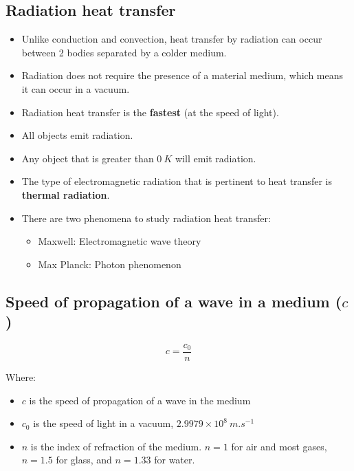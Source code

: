 \documentclass[11pt]{article}
\begin{document}
\subsection{Radiation heat transfer}
\label{sec:org29b78fd}
\begin{itemize}
\item Unlike conduction and convection, heat transfer by radiation can occur between 2 bodies separated by a colder medium.
\item Radiation does not require the presence of a material medium, which means it can occur in a vacuum.
\item Radiation heat transfer is the \textbf{fastest} (at the speed of light).
\item All objects emit radiation.
\item Any object that is greater than \(\qty{0}{K}\) will emit radiation.
\item The type of electromagnetic radiation that is pertinent to heat transfer is \textbf{thermal radiation}.
\item There are two phenomena to study radiation heat transfer:
\begin{itemize}
\item Maxwell: Electromagnetic wave theory
\item Max Planck: Photon phenomenon
\end{itemize}
\end{itemize}

\subsection{Speed of propagation of a wave in a medium (\(c\))}
\label{sec:org9d84eac}
\[c = \frac{c_0}{n}\]

Where:
\begin{itemize}
\item \(c\) is the speed of propagation of a wave in the medium
\item \(c_0\) is the speed of light in a vacuum, \(2.9979 \times 10^8 \ \unit{m.s^{-1}}\)
\item \(n\) is the index of refraction of the medium. \(n = 1\) for air and most gases, \(n = 1.5\) for glass, and \(n = 1.33\) for water.
\end{itemize}
\end{document}
